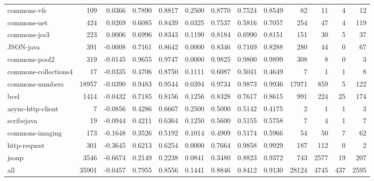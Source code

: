 \begin{table*}
\begin{tabular}{lrrrrrrrrrrrr}
            commons-vfs &    109 &      0.0366 &  0.7890 &     0.8817 &     0.2500 &  0.8770 &     0.7524 &   0.8549 &     82 &    11 &    4 &    12 \\
            commons-net &    424 &      0.0269 &  0.6085 &     0.8439 &     0.0325 &  0.7537 &     0.5816 &   0.7057 &    254 &    47 &    4 &   119 \\
           commons-jcs3 &    223 &      0.0006 &  0.6996 &     0.8343 &     0.1190 &  0.8184 &     0.6990 &   0.8151 &    151 &    30 &    5 &    37 \\
              JSON-java &    391 &     -0.0008 &  0.7161 &     0.8642 &     0.0000 &  0.8346 &     0.7169 &   0.8288 &    280 &    44 &    0 &    67 \\
          commons-pool2 &    319 &     -0.0145 &  0.9655 &     0.9747 &     0.0000 &  0.9825 &     0.9800 &   0.9899 &    308 &     8 &    0 &     3 \\
   commons-collections4 &     17 &     -0.0335 &  0.4706 &     0.8750 &     0.1111 &  0.6087 &     0.5041 &   0.4649 &      7 &     1 &    1 &     8 \\
        commons-numbers &  18957 &     -0.0390 &  0.9483 &     0.9544 &     0.0394 &  0.9734 &     0.9873 &   0.9936 &  17971 &   859 &    5 &   122 \\
                   bcel &   1414 &     -0.0432 &  0.7185 &     0.8156 &     0.1256 &  0.8328 &     0.7617 &   0.8615 &    991 &   224 &   25 &   174 \\
      async-http-client &      7 &     -0.0856 &  0.4286 &     0.6667 &     0.2500 &  0.5000 &     0.5142 &   0.4175 &      2 &     1 &    1 &     3 \\
             scribejava &     19 &     -0.0944 &  0.4211 &     0.6364 &     0.1250 &  0.5600 &     0.5155 &   0.5758 &      7 &     4 &    1 &     7 \\
        commons-imaging &    173 &     -0.1648 &  0.3526 &     0.5192 &     0.1014 &  0.4909 &     0.5174 &   0.5966 &     54 &    50 &    7 &    62 \\
           http-request &    301 &     -0.3645 &  0.6213 &     0.6254 &     0.0000 &  0.7664 &     0.9858 &   0.9929 &    187 &   112 &    0 &     2 \\
                  jsoup &   3546 &     -0.6674 &  0.2149 &     0.2238 &     0.0841 &  0.3480 &     0.8823 &   0.9372 &    743 &  2577 &   19 &   207 \\
                    all &  35901 &     -0.0457 &  0.7955 &     0.8556 &     0.1441 &  0.8846 &     0.8412 &   0.9130 &  28124 &  4745 &  437 &  2595 \\
\bottomrule
\end{tabular}
\end{table*}
